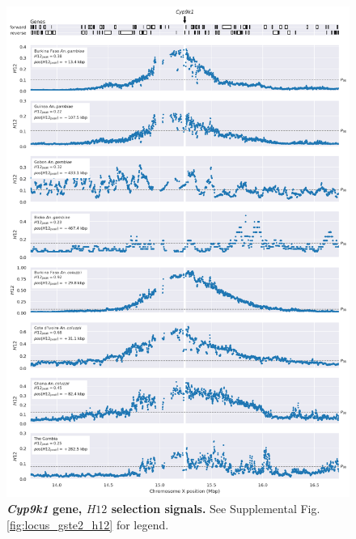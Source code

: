 \documentclass[a4paper,11pt,abstracton,hidelinks]{scrartcl}
\begin{document}
\begin{figure}[t!]
	\begin{center}
		\includegraphics*[width=1\linewidth,center]{artwork/locus_cyp9k1_h12_pdist.png}
	\end{center}
	\caption[\textit{Cyp9k1} gene, $H12$ selection signals]{
	\textbf{\textit{Cyp9k1} gene, $H12$ selection signals.}
	See Supplemental Fig. \ref{fig:locus_gste2_h12} for legend.
	} 
	\label{fig:locus_cyp9k1_h12}
\end{figure}


\clearpage
\end{document}
